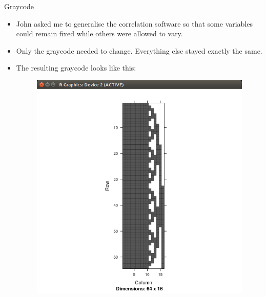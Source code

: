 \documentclass{beamer}
\begin{document}
\begin{frame}{Graycode}
\begin{itemize}
\item John asked me to generalise the correlation software so that some variables could remain fixed
			while others were allowed to vary.
\item Only the graycode needed to change. Everything else stayed exactly the same.
\item The resulting graycode looks like this:
\begin{figure}
\includegraphics[scale=.2]{Graycode_fixed.png}
\end{figure}
\end{itemize}
\end{frame}
\end{document}
